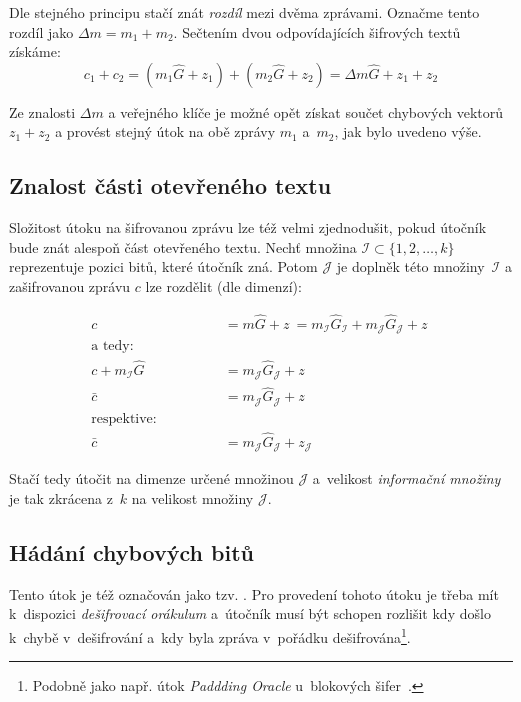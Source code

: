 \documentclass[thesis=M,czech,hidelinks]{FITthesis}[2012/06/26]
\newcommand{\0}{{\textcolor[gray]{0.75}{0}}}
\begin{document}
Dle stejného principu stačí znát \emph{rozdíl} mezi dvěma zprávami. Označme
tento rozdíl jako $\Delta m = m_1 + m_2$. Sečtením dvou odpovídajících šifrových
textů získáme:
$$
    c_1 + c_2 = (m_1\hat{G} + z_1) + (m_2\hat{G} + z_2) =
    \Delta m \hat{G} + z_1 + z_2
$$

Ze znalosti $\Delta m$ a veřejného klíče je možné opět získat součet chybových
vektorů $z_1 + z_2 $ a provést stejný útok na obě zprávy $m_1$ a~$m_2$, jak bylo
uvedeno výše.


\subsection{Znalost části otevřeného textu}

Složitost útoku na šifrovanou zprávu lze též velmi zjednodušit, pokud útočník
bude znát alespoň část otevřeného textu. Nechť množina $\mathcal{I} \subset
\{1,2,\ldots,k\}$ reprezentuje pozici bitů, které útočník zná. Potom
$\mathcal{J}$ je doplněk této množiny~$\mathcal{I}$ a zašifrovanou zprávu $c$
lze rozdělit (dle dimenzí):

\begin{align*}
    c &= m\hat{G} + z~=
    m_{\mathcal{I}}\hat{G}_{\mathcal{I}} + m_{\mathcal{J}}\hat{G}_{\mathcal{J}} + z~\\
    \text{a tedy:} \qquad \qquad \\
    c + m_{\mathcal{I}}\hat{G} &= m_{\mathcal{J}}\hat{G}_{\mathcal{J}} + z~\\
                       \bar{c} &= m_{\mathcal{J}}\hat{G}_{\mathcal{J}} + z~\\
    \text{respektive:} \qquad \qquad \\
                       \bar{c} &= m_{\mathcal{J}}\hat{G}_{\mathcal{J}} + z_{\mathcal{J}}
\end{align*}


Stačí tedy útočit na dimenze určené množinou $\mathcal{J}$ a~velikost
\emph{informační množiny} je tak zkrácena z~$k$ na velikost množiny
$\mathcal{J}$.


\subsection{Hádání chybových bitů}

Tento útok je též označován jako tzv. . Pro provedení tohoto
útoku je třeba mít k~dispozici \emph{dešifrovací orákulum} a~útočník musí být
schopen rozlišit kdy došlo k~chybě v~dešifrování a~kdy byla zpráva v~pořádku
dešifrována\footnote{
    Podobně jako např. útok \emph{Paddding Oracle} u~blokových
    šifer~\cite{FIT_KRY}.
}.
\end{document}
